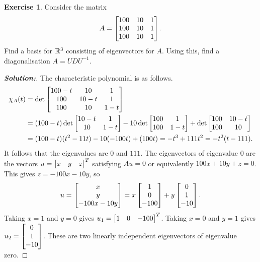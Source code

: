 \documentclass[a4paper]{amsart}
\theoremstyle{definition}
\newtheorem{exercise}{Exercise}
\newenvironment{solution}{\begin{proof}[\textbf{Solution:}] \vphantom{u}}{\end{proof}}
\begin{document}
\begin{exercise}\label{ex-diagonal-iii}
 Consider the matrix
 \[ A = \left[\begin{matrix} 100&10&1 \\ 100&10&1 \\ 100&10&1 \end{matrix}\right]. \]
 Find a basis for ${\mathbb{R}}^3$ consisting of eigenvectors for $A$.  Using
 this, find a diagonalisation $A=UDU^{-1}$.
\end{exercise}
\begin{solution}
 The characteristic polynomial is as follows.
 \begin{align*}
  \chi_A(t)
   &= \det\left[\begin{matrix} 100-t & 10 & 1 \\ 
               100 & 10-t & 1 \\
               100 & 10 & 1-t \end{matrix}\right] \\
   &= (100-t)\det\left[\begin{matrix} 10-t & 1 \\
                      10   & 1-t \end{matrix}\right] 
      -10    \det\left[\begin{matrix} 100  & 1 \\
                      100 & 1-t \end{matrix}\right] 
      +      \det\left[\begin{matrix} 100 & 10-t \\
                      100 & 10 \end{matrix}\right] \\
   &= (100-t)(t^2-11t) -10(-100t)+(100t) = -t^3+111t^2 = -t^2(t-111).
 \end{align*}
 It follows that the eigenvalues are $0$ and $111$.  The eigenvectors
 of eigenvalue $0$ are the vectors $u=\left[\begin{matrix} x&y&z\end{matrix}\right]^T$ satisfying
 $Au=0$ or equivalently $100x+10y+z=0$.  This gives $z=-100x-10y$, so 
 \[ u
      = \left[\begin{matrix} x\\y\\-100x-10y\end{matrix}\right] 
      = x \left[\begin{matrix} 1\\0\\-100 \end{matrix}\right] + y \left[\begin{matrix} 0\\1\\-10\end{matrix}\right].
 \]
 Taking $x=1$ and $y=0$ gives $u_1=\left[\begin{matrix} 1&0&-100\end{matrix}\right]^T$.  Taking $x=0$
 and $y=1$ gives $u_2=\left[\begin{matrix} 0\\1\\-10\end{matrix}\right]$.  These are two linearly
 independent eigenvectors of eigenvalue zero.  


\end{solution}
\end{document}
